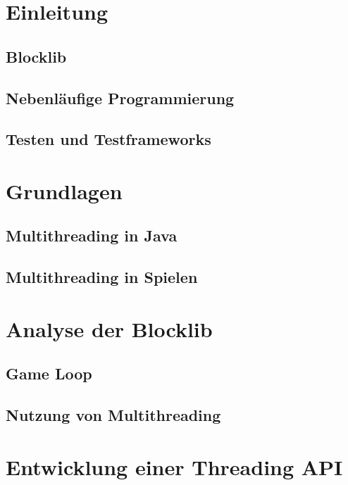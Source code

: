 \documentclass[12pt,a4paper,listof=totocnumbered,parskip=half]{scrreprt}
\begin{document}

\null\thispagestyle{empty}\clearpage
\tableofcontents
\chapter{Einleitung}
\section{Blocklib}
\section{Nebenläufige Programmierung}
\section{Testen und Testframeworks}

\chapter{Grundlagen}


\section{Multithreading in Java}

\section{Multithreading in Spielen}


\chapter{Analyse der Blocklib}

\section{Game Loop}

\section{Nutzung von Multithreading}



\chapter{Entwicklung einer Threading API}
\end{document}

